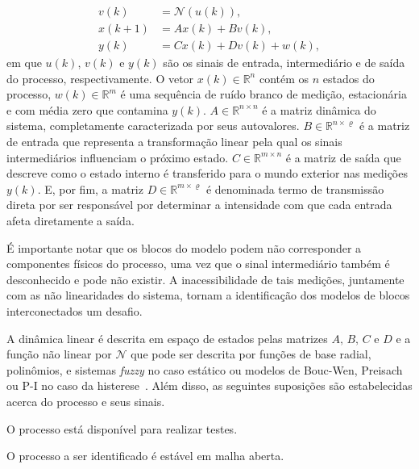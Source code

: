 %
\begin{subequations}
	\begin{align}
		v(k) &= \mathcal{N}(u(k)),\\
		x(k+1) &= Ax(k) + Bv(k),\label{eq:cap1ee1}\\
		y(k) &= Cx(k) + Dv(k) + w(k),\label{eq:cap1ee2}
	\end{align}
	\label{eq:ee2cap1}
\end{subequations}
%
\hspace{-1.5mm}em que $u(k)$, $v(k)$ e $y(k)$ são os sinais de entrada, intermediário e de saída do processo, respectivamente. O vetor $x(k) \in \mathbb{R}^{ n }$ contém os $n$ estados do processo, $w(k) \in \mathbb{R}^{ m }$ é uma sequência de ruído branco de medição, estacionária e com média zero que contamina $y(k)$. $A \in \mathbb{R}^{ n\times n }$ é a matriz dinâmica do sistema, completamente caracterizada por seus autovalores. $B \in \mathbb{R}^{ n\times \varrho}$ é a matriz de entrada que representa a transformação linear pela qual os sinais intermediários influenciam o próximo estado. $C \in \mathbb{R}^{ m\times n }$ é a matriz de saída que descreve como o estado interno é transferido para o mundo exterior nas medições $y(k)$. E, por fim, a matriz $D \in \mathbb{R}^{ m\times \varrho}$ é denominada termo de transmissão direta por ser responsável por determinar a intensidade com que cada entrada afeta diretamente a saída.
\par 
É importante notar que os blocos do modelo podem não corresponder a componentes físicos do processo, uma vez que o sinal intermediário também é desconhecido e pode não existir. A inacessibilidade de tais medições, juntamente com as não linearidades do sistema, tornam a identificação dos modelos de blocos interconectados um desafio. 
\par
A dinâmica linear é descrita em espaço de estados pelas matrizes $A, \, B, \, C$ e $D$ e a função não linear por $\mathcal{N}$ que pode ser descrita por funções de base radial, polinômios, e sistemas \textit{fuzzy} no caso estático ou modelos de Bouc-Wen, Preisach ou \acs{P-I} no caso da histerese~\citep{noel2017}. Além disso, as seguintes suposições são estabelecidas acerca do processo e seus sinais.
\par
\begin{suposicao}
	O processo está disponível para realizar testes.
\end{suposicao}
\begin{suposicao}
	O processo a ser identificado é estável em malha aberta.
\end{suposicao}
